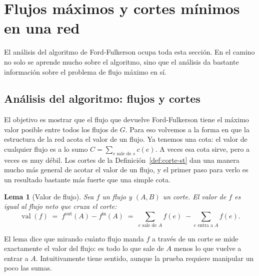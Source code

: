 \documentclass[12pt, spanish, oneside, openany]{book}
\theoremstyle{uprightplain}
\newtheorem{lema}[teorema]{Lema}
\theoremstyle{definition}
\theoremstyle{remark}
\theoremstyle{definition}
\newcommand{\val}{\operatorname{val}}   %
\begin{document}
\section{Flujos máximos y cortes mínimos en una red}
\label{sec:flujo-cortes}

El análisis del algoritmo de Ford-Fulkerson ocupa toda esta sección. En el camino no solo se aprende mucho sobre el algoritmo, sino que el análisis da bastante información sobre el problema de flujo máximo en sí.

\subsection{Análisis del algoritmo: flujos y cortes}

El objetivo es mostrar que el flujo que devuelve Ford-Fulkerson tiene el máximo valor posible entre todos los flujos de $G$. Para eso volvemos a la forma en que la estructura de la red acota el valor de un flujo. Ya tenemos una cota: el valor de cualquier flujo es a lo sumo $C=\sum_{e\text{ sale de }s}c(e)$. A veces esa cota sirve, pero a veces es muy débil. Los cortes de la Definición~\ref{def:corte-st} dan una manera mucho más general de acotar el valor de un flujo, y el primer paso para verlo es un resultado bastante más fuerte que una simple cota.

\begin{lema}[Valor de flujo]
\label{lema:flujo-valor-corte}
Sea $f$ un flujo y $(A,B)$ un corte. El valor de $f$ es igual al flujo neto que cruza el corte:
\[
\val(f)\;=\;f^{\mathrm{out}}(A)-f^{\mathrm{in}}(A)\;=\;\sum_{e\text{ sale de }A}f(e)\;-\sum_{e\text{ entra a }A}f(e).
\]
\end{lema}

El lema dice que mirando cuánto flujo manda $f$ a través de un corte se mide exactamente el valor del flujo: es todo lo que sale de $A$ menos lo que vuelve a entrar a $A$. Intuitivamente tiene sentido, aunque la prueba requiere manipular un poco las sumas.
\end{document}
